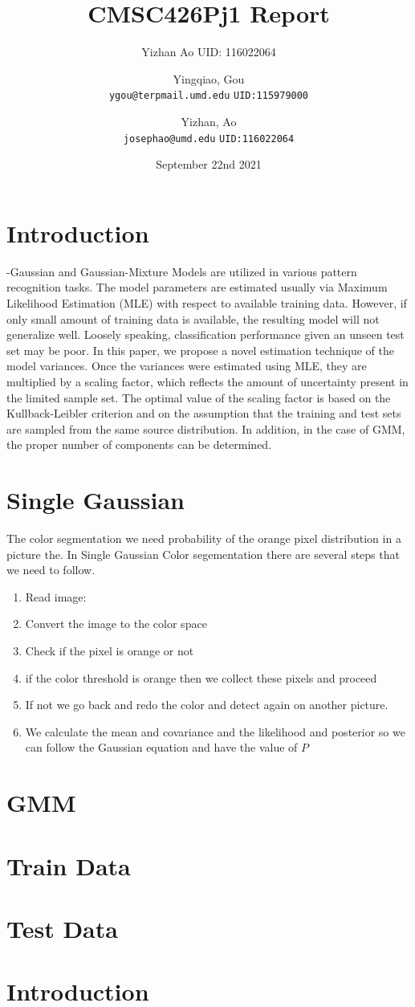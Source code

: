 \documentclass{article}
\title{CMSC426Pj1 Report}
\author{Yizhan Ao UID: 116022064}
\author{
  Yingqiao, Gou\\
  \texttt{ygou@terpmail.umd.edu}
  \texttt{UID:115979000}
  \and
  Yizhan, Ao\\
  \texttt{josephao@umd.edu}
  \texttt{UID:116022064}
}
\date{September 22nd 2021}
\begin{document}
\maketitle

\section{Introduction}
\begin{enumerate}
    \paragraphSingle-Gaussian and Gaussian-Mixture Models are utilized in various pattern recognition tasks. The model parameters are estimated usually via Maximum Likelihood Estimation (MLE) with respect to available training data. However, if only small amount of training data is available, the resulting model will not generalize well. Loosely speaking, classification performance given an unseen test set may be poor. In this paper, we propose a novel estimation technique of the model variances. Once the variances were estimated using MLE, they are multiplied by a scaling factor, which reflects the amount of uncertainty present in the limited sample set. The optimal value of the scaling factor is based on the Kullback-Leibler criterion and on the assumption that the training and test sets are sampled from the same source distribution. In addition, in the case of GMM, the proper number of components can be determined.
\end{enumerate}

\section{Single Gaussian}
The color segmentation we need probability of the orange pixel distribution in a picture the. In Single Gaussian Color segementation there are several steps that we need to follow. 
\begin{enumerate}
    \item Read image: 
    \item Convert the image to the color space 
    \item Check if the pixel is orange or not
    \item if the color threshold is orange then we collect these pixels and proceed
    \item If not we go back and redo the color and detect again on another picture. 
    \item We calculate the mean and covariance and the likelihood and posterior so we can follow the Gaussian equation and have the value of $P$
\end{enumerate}

\section{GMM}

\section{Train Data }
\section{Test Data}

\section{Introduction}
\end{document}
